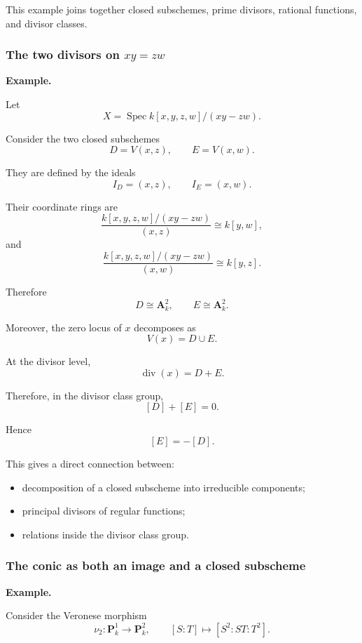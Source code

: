 This example joins together closed subschemes, prime divisors, rational functions, and divisor classes.

\subsubsection{\texorpdfstring{The two divisors on \(xy=zw\)}{Two divisors on the three-dimensional cone}}

\textbf{Example.}

Let
\[
X=\operatorname{Spec}k[x,y,z,w]/(xy-zw).
\]

Consider the two closed subschemes
\[
D=V(x,z),
\qquad
E=V(x,w).
\]

They are defined by the ideals
\[
I_D=(x,z),
\qquad
I_E=(x,w).
\]

Their coordinate rings are
\[
\frac{k[x,y,z,w]/(xy-zw)}{(x,z)}
\cong
k[y,w],
\]
and
\[
\frac{k[x,y,z,w]/(xy-zw)}{(x,w)}
\cong
k[y,z].
\]

Therefore
\[
D\cong\mathbf A^2_k,
\qquad
E\cong\mathbf A^2_k.
\]

Moreover, the zero locus of \(x\) decomposes as
\[
V(x)=D\cup E.
\]

At the divisor level,
\[
\operatorname{div}(x)=D+E.
\]

Therefore, in the divisor class group,
\[
[D]+[E]=0.
\]

Hence
\[
[E]=-[D].
\]

This gives a direct connection between:

\begin{itemize}
	\item decomposition of a closed subscheme into irreducible components;
	\item principal divisors of regular functions;
	\item relations inside the divisor class group.
\end{itemize}

\subsubsection{The conic as both an image and a closed subscheme}

\textbf{Example.}

Consider the Veronese morphism
\[
\nu_2:\mathbf P^1_k\longrightarrow\mathbf P^2_k,
\qquad
[S:T]\longmapsto[S^2:ST:T^2].
\]

